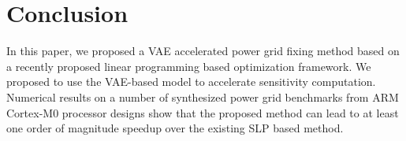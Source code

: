 \documentclass[journal]{IEEEtran}
\begin{document}


\section{Conclusion}
\label{sec:conclusion}
In this paper, we proposed a VAE accelerated power grid fixing method
based on a recently proposed linear programming based optimization
framework.  We proposed to use the VAE-based model to accelerate
sensitivity computation.  Numerical results on a number of synthesized
power grid benchmarks from ARM Cortex-M0 processor designs show that
the proposed method can lead to at least one order of magnitude
speedup over the existing SLP based method.






%
%
\end{document}

